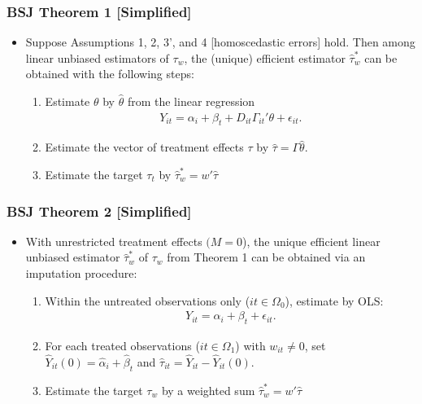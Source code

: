 \documentclass[english,xcolor=svgnames]{beamer}
\begin{document}
\begin{frame}
\frametitle[alignment=center]{BSJ Theorem 1 [Simplified]}
\begin{itemize}
	\item Suppose Assumptions 1, 2, 3', and 4 [homoscedastic errors] hold. Then among linear unbiased estimators of $\tau_w$, the (unique) efficient estimator $\hat{\tau}_w^*$ can be obtained with the following steps:
	\begin{enumerate}
		\item Estimate $\theta$ by $\hat{\theta}$ from the linear regression
		\begin{align*}
			Y_{it} = \alpha_i + \beta_t + D_{it}\Gamma_{it}'\theta + \epsilon_{it}.
		\end{align*}
		\item Estimate the vector of treatment effects $\tau$ by $\hat{\tau}=\Gamma \hat{\theta}$.
		\item Estimate the target $\tau_t$ by $\hat{\tau}_w^* = w'\hat{\tau}$
	\end{enumerate}
\end{itemize}
\end{frame}

\begin{frame}
\frametitle[alignment=center]{BSJ Theorem 2 [Simplified]}
\begin{itemize}
	\item With unrestricted treatment effects $(M=0$), the unique efficient linear unbiased estimator $\hat{\tau}_w^*$ of $\tau_w$ from Theorem 1 can be obtained via an imputation procedure:
	\begin{enumerate}
		\item Within the untreated observations only ($it\in \Omega_0$), estimate by OLS:
		\begin{align*}
			Y_{it} = \alpha_i + \beta_t + \epsilon_{it}.
		\end{align*}
		\item For each treated observations ($it\in \Omega_1$) with $w_{it}\neq 0$, set  $\hat{Y}_{it}(0) = \hat{\alpha}_i + \hat{\beta}_t$ and $\hat{\tau}_{it} = \hat{Y}_{it} - \hat{Y}_{it}(0)$.
		\item Estimate the target $\tau_w$ by a weighted sum $\hat{\tau}_w^*=w'\hat{\tau}$
	\end{enumerate}
\end{itemize}
\end{frame}
\end{document}
